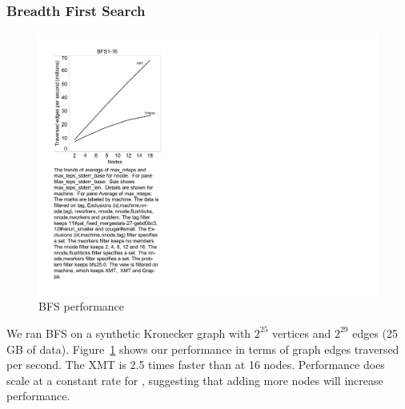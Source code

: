 {\subsubsection{Breadth First Search}
\begin{figure}[tH]
\begin{center}
  \includegraphics[width=0.95\columnwidth]{figs/bfs_performance}
\begin{minipage}{0.95\columnwidth}
  \caption{\label{fig:bfs-performance} BFS performance}
\end{minipage}
\vspace{-3ex}
\end{center}
\end{figure}

We ran BFS on a synthetic Kronecker graph with $2^{25}$ vertices and
$2^{29}$ edges (25 GB of data). Figure~\ref{fig:bfs-performance} shows
our performance in terms of graph edges traversed per second. The XMT
is 2.5 times faster than \Grappa at 16 nodes.  Performance does scale at a constant rate for \Grappa, suggesting that adding more nodes will increase performance.

}
